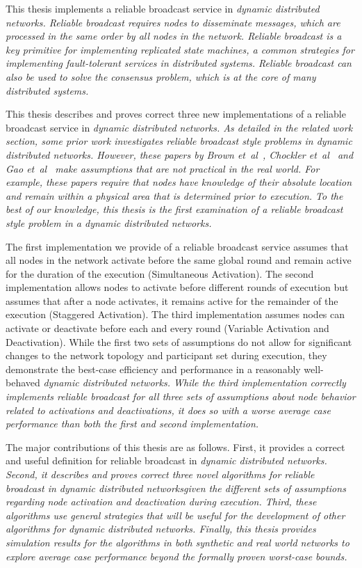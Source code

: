 \documentclass[english]{article}
\begin{document}
This thesis implements a reliable broadcast service in \em dynamic distributed networks\em. Reliable broadcast requires nodes to disseminate messages, which are processed in the same order by all nodes in the network. Reliable broadcast is a key primitive for implementing replicated state machines, a common strategies for implementing fault-tolerant services in distributed systems. Reliable broadcast can also be used to solve the consensus problem, which is at the core of many distributed systems.

This thesis describes and proves correct three new implementations of a reliable broadcast service in \em dynamic distributed networks\em. As detailed in the related work section, some prior work investigates reliable broadcast style problems in \em dynamic distributed networks\em. However, these papers by Brown et~al~\cite{Brown:2007}, Chockler et~al~\cite{Chockler:2008} and Gao et~al~\cite{Gao:2012} make assumptions that are not practical in the real world. For example, these papers require that nodes have knowledge of their absolute location and remain within a physical area that is determined prior to execution. To the best of our knowledge, this thesis is the first examination of a reliable broadcast style problem in a \em dynamic distributed networks\em.

The first implementation we provide of a reliable broadcast service assumes that all nodes in the network activate before the same global round and remain active for the duration of the execution (Simultaneous Activation). The second implementation allows nodes to activate before different rounds of execution but assumes that after a node activates, it remains active for the remainder of the execution (Staggered Activation).  The third implementation assumes nodes can activate or deactivate before each and every round (Variable Activation and Deactivation). While the first two sets of assumptions do not allow for significant changes to the network topology and participant set during execution, they demonstrate the best-case efficiency and performance in a reasonably well-behaved \em dynamic distributed networks\em. While the third implementation correctly implements reliable broadcast for all three sets of assumptions about node behavior related to activations and deactivations, it does so with a worse average case performance than both the first and second implementation. 

The major contributions of this thesis are as follows. First, it provides a correct and useful definition for reliable broadcast in \em dynamic distributed networks\em. Second, it describes and proves correct three novel algorithms for reliable broadcast in \em dynamic distributed networks\em given the different sets of assumptions regarding node activation and deactivation during execution. Third, these algorithms use general strategies that will be useful for the development of other algorithms for \em dynamic distributed networks\em. Finally, this thesis provides simulation results for the algorithms in both synthetic and real world networks to explore average case performance beyond the formally proven worst-case bounds.
\end{document}
